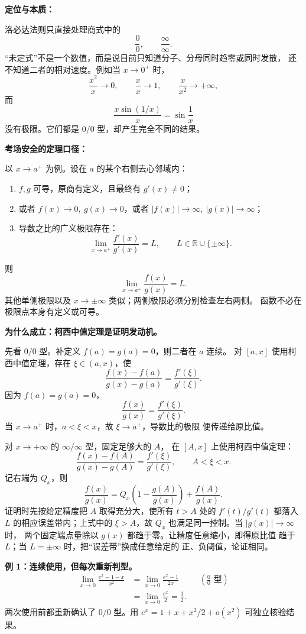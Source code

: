 \begin{knowledgeBox}
\textbf{定位与本质：}

洛必达法则只直接处理商式中的
\[
\frac00,\qquad \frac{\infty}{\infty}.
\]
“未定式”不是一个数值，而是说目前只知道分子、分母同时趋零或同时发散，
还不知道二者的相对速度。例如当 \(x\to0^+\) 时，
\[
\frac{x^2}{x}\to0,\qquad
\frac{x}{x}\to1,\qquad
\frac{x}{x^2}\to+\infty,
\]
而
\[
\frac{x\sin(1/x)}{x}=\sin\frac1x
\]
没有极限。它们都是 \(0/0\) 型，却产生完全不同的结果。

\textbf{考场安全的定理口径：}

以 \(x\to a^+\) 为例。设在 \(a\) 的某个右侧去心邻域内：
\begin{enumerate}
  \item \(f,g\) 可导，原商有定义，且最终有 \(g'(x)\ne0\)；
  \item 或者 \(f(x)\to0,\ g(x)\to0\)，或者
  \(|f(x)|\to\infty,\ |g(x)|\to\infty\)；
  \item 导数之比的广义极限存在：
  \[
  \lim_{x\to a^+}\frac{f'(x)}{g'(x)}=L,
  \qquad L\in\mathbb R\cup\{\pm\infty\}.
  \]
\end{enumerate}
则
\[
\boxed{\lim_{x\to a^+}\frac{f(x)}{g(x)}=L.}
\]
其他单侧极限以及 \(x\to\pm\infty\) 类似；两侧极限必须分别检查左右两侧。
函数不必在极限点本身有定义或可导。

\textbf{为什么成立：柯西中值定理是证明发动机。}

先看 \(0/0\) 型。补定义 \(f(a)=g(a)=0\)，则二者在 \(a\) 连续。
对 \([a,x]\) 使用柯西中值定理，存在
\(\xi\in(a,x)\)，使
\[
\frac{f(x)-f(a)}{g(x)-g(a)}
=\frac{f'(\xi)}{g'(\xi)}.
\]
因为 \(f(a)=g(a)=0\)，
\[
\frac{f(x)}{g(x)}=\frac{f'(\xi)}{g'(\xi)}.
\]
当 \(x\to a^+\) 时，\(a<\xi<x\)，故 \(\xi\to a^+\)，导数比的极限
便传递给原比值。

对 \(x\to+\infty\) 的 \(\infty/\infty\) 型，固定足够大的 \(A\)，
在 \([A,x]\) 上使用柯西中值定理：
\[
\frac{f(x)-f(A)}{g(x)-g(A)}
=\frac{f'(\xi)}{g'(\xi)},\qquad A<\xi<x.
\]
记右端为 \(Q_x\)，则
\[
\frac{f(x)}{g(x)}
=Q_x\left(1-\frac{g(A)}{g(x)}\right)
+\frac{f(A)}{g(x)}.
\]
证明时先按给定精度把 \(A\) 取得充分大，使所有 \(t>A\) 处的
\(f'(t)/g'(t)\) 都落入 \(L\) 的相应误差带内；上式中的
\(\xi>A\)，故 \(Q_x\) 也满足同一控制。当 \(|g(x)|\to\infty\) 时，
两个固定端点量除以 \(g(x)\) 都趋于零。让精度任意缩小，即得原比值
趋于 \(L\)；当 \(L=\pm\infty\) 时，把“误差带”换成任意给定的
正、负阈值，论证相同。

\textbf{例 1：连续使用，但每次重新判型。}
\[
\begin{aligned}
\lim_{x\to0}\frac{e^x-1-x}{x^2}
&=\lim_{x\to0}\frac{e^x-1}{2x}
&&\left(\frac00\text{ 型}\right)\\
&=\lim_{x\to0}\frac{e^x}{2}
=\frac12.
\end{aligned}
\]
两次使用前都重新确认了 \(0/0\) 型。用
\(e^x=1+x+x^2/2+o(x^2)\) 可独立核验结果。


\end{knowledgeBox}
